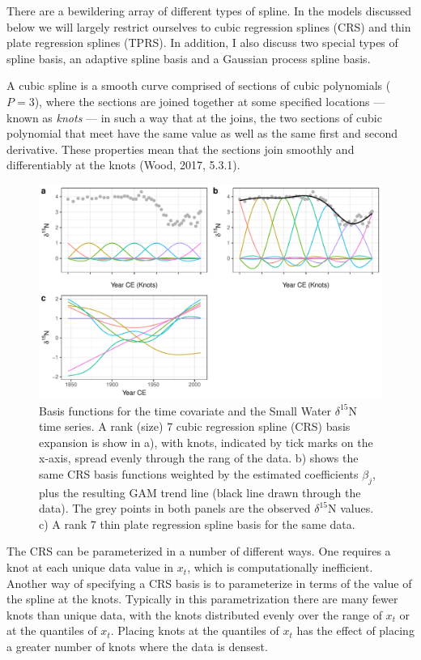 \documentclass[12pt,]{article}
\begin{document}
There are a bewildering array of different types of spline. In the
models discussed below we will largely restrict ourselves to cubic
regression splines (CRS) and thin plate regression splines (TPRS). In
addition, I also discuss two special types of spline basis, an adaptive
spline basis and a Gaussian process spline basis.

A cubic spline is a smooth curve comprised of sections of cubic
polynomials (\(P = 3\)), where the sections are joined together at some
specified locations --- known as \emph{knots} --- in such a way that at
the joins, the two sections of cubic polynomial that meet have the same
value as well as the same first and second derivative. These properties
mean that the sections join smoothly and differentiably at the knots
(Wood, 2017, 5.3.1).

\begin{figure}

{\centering \includegraphics[width=0.8\linewidth]{manuscript_files/figure-latex/basis-function-example-plot-1} 

}

\caption{Basis functions for the time covariate and the Small Water $\delta^{15}\text{N}$ time series. A rank (size) 7 cubic regression spline (CRS) basis expansion is show in a), with knots, indicated by tick marks on the x-axis, spread evenly through the rang of the data. b) shows the same CRS basis functions weighted by the estimated coefficients $\beta_j$, plus the resulting GAM trend line (black line drawn through the data). The grey points in both panels are the observed $\delta^{15}\text{N}$ values. c) A rank 7 thin plate regression spline basis for the same data.}\label{fig:basis-function-example-plot}
\end{figure}

The CRS can be parameterized in a number of different ways. One requires
a knot at each unique data value in \(x_t\), which is computationally
inefficient. Another way of specifying a CRS basis is to parameterize in
terms of the value of the spline at the knots. Typically in this
parametrization there are many fewer knots than unique data, with the
knots distributed evenly over the range of \(x_t\) or at the quantiles
of \(x_t\). Placing knots at the quantiles of \(x_t\) has the effect of
placing a greater number of knots where the data is densest.
\end{document}
